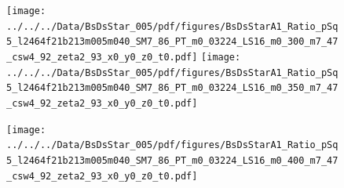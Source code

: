 \documentclass[a4paper,10pt]{article}
\begin{document}
\clearpage
\begin{figure}[p]
 \texttt{[image: ../../../Data/BsDsStar\_005/pdf/figures/BsDsStarA1\_Ratio\_pSq5\_l2464f21b213m005m040\_SM7\_86\_PT\_m0\_03224\_LS16\_m0\_300\_m7\_47\_csw4\_92\_zeta2\_93\_x0\_y0\_z0\_t0.pdf]} 
 \texttt{[image: ../../../Data/BsDsStar\_005/pdf/figures/BsDsStarA1\_Ratio\_pSq5\_l2464f21b213m005m040\_SM7\_86\_PT\_m0\_03224\_LS16\_m0\_350\_m7\_47\_csw4\_92\_zeta2\_93\_x0\_y0\_z0\_t0.pdf]} 
 \end{figure}
\begin{figure}[p]
 \texttt{[image: ../../../Data/BsDsStar\_005/pdf/figures/BsDsStarA1\_Ratio\_pSq5\_l2464f21b213m005m040\_SM7\_86\_PT\_m0\_03224\_LS16\_m0\_400\_m7\_47\_csw4\_92\_zeta2\_93\_x0\_y0\_z0\_t0.pdf]} 
 \end{figure}
\clearpage
\end{document}
